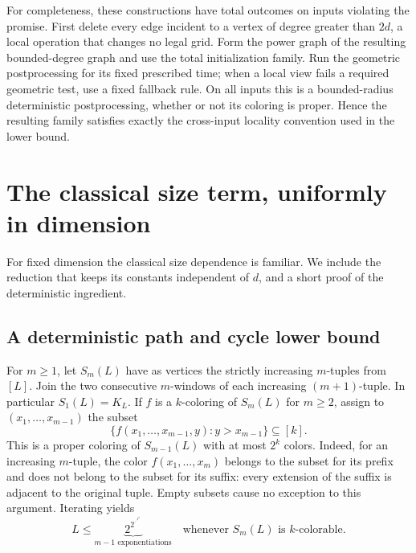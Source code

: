 \documentclass[11pt]{article}
\theoremstyle{definition}\newtheorem{definition}[theorem]{Definition}
\theoremstyle{remark}\newtheorem{remark}[theorem]{Remark}
\begin{document}
For completeness, these constructions have total outcomes on
inputs violating the promise. First delete every edge incident
to a vertex of degree greater than $2d$, a local operation that
changes no legal grid. Form the power graph of the resulting
bounded-degree graph and use the total initialization family.
Run the geometric postprocessing for its fixed prescribed time;
when a local view fails a required geometric test, use a fixed
fallback rule. On all inputs this is a bounded-radius
deterministic postprocessing, whether or not its coloring is
proper. Hence the resulting family satisfies exactly the
cross-input locality convention used in the lower bound.

\section{The classical size term, uniformly in dimension}
\label{sec:size}

For fixed dimension the classical size dependence is familiar.
We include the reduction that keeps its constants independent of
$d$, and a short proof of the deterministic ingredient.

\subsection{A deterministic path and cycle lower bound}

For $m\ge1$, let $S_m(L)$ have as vertices the strictly increasing
$m$-tuples from $[L]$. Join the two consecutive $m$-windows of
each increasing $(m+1)$-tuple. In particular $S_1(L)=K_L$.
If $f$ is a $k$-coloring of $S_m(L)$ for $m\ge2$, assign to
$(x_1,\ldots,x_{m-1})$ the subset
\[
 \{f(x_1,\ldots,x_{m-1},y):y>x_{m-1}\}\subseteq[k].
\]
This is a proper coloring of $S_{m-1}(L)$ with at most $2^k$
colors. Indeed, for an increasing $m$-tuple, the color
$f(x_1,\ldots,x_m)$ belongs to the subset for its prefix
and does not belong to the subset for its suffix: every
extension of the suffix is adjacent to the original tuple.
Empty subsets cause no exception to this argument.
Iterating yields
\begin{equation}\label{eq:shift}
     L\le \underbrace{2^{2^{\cdot^{\cdot^{2^k}}}}}_{m-1
        \text{ exponentiations}}
     \quad\text{whenever }S_m(L)\text{ is }k\text{-colorable}.
\end{equation}
\end{document}
